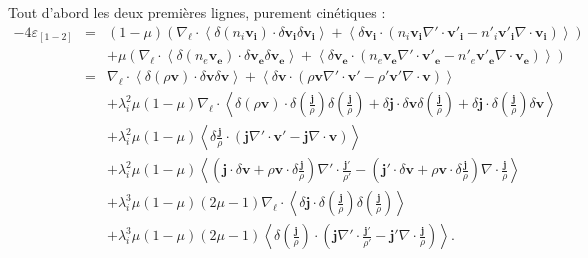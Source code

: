 Tout d'abord les deux premières lignes, purement cinétiques : 
\begin{eqnarray}%
   - 4  \varepsilon_{[1-2]}&=& \left(1-\mu\right)\left( \nabla_{\boldsymbol{\ell}} \cdot\left<  \delta \left(n_i \boldsymbol{v_i}\right) \cdot \delta \boldsymbol{v_i}\delta \boldsymbol{v_i} \right> +\left<\delta \boldsymbol{v_i}\cdot \left(n_i \boldsymbol{v_i}   \nabla' \cdot \boldsymbol{v'_i}- n'_i \boldsymbol{v'_i} \nabla \cdot \boldsymbol{v_i}\right)\right>\right) \nonumber \\ %
 &&+ \mu\left( \nabla_{\boldsymbol{\ell}} \cdot\left<  \delta \left(n_e \boldsymbol{v_e}\right) \cdot \delta \boldsymbol{v_e}\delta \boldsymbol{v_e} \right> +\left<\delta \boldsymbol{v_e}\cdot \left(n_e \boldsymbol{v_e}   \nabla' \cdot \boldsymbol{v'_e}- n'_e \boldsymbol{v'_e} \nabla \cdot \boldsymbol{v_e}\right)\right>\right) \nonumber \\ %
\label{eq:turb_bi_EL1-2} &=& \nabla_{\boldsymbol{\ell}} \cdot\left<  \delta \left(\rho\boldsymbol{v}\right) \cdot \delta \boldsymbol{v} \delta  \boldsymbol{v} \right> +\left< \delta  \boldsymbol{v}\cdot \left(\rho \boldsymbol{v} \nabla' \cdot \boldsymbol{v'} - \rho' \boldsymbol{v'} \nabla \cdot \boldsymbol{v} \right)\right>\nonumber\\%
&&+ \lambda_i^2 \mu\left(1-\mu\right) \nabla_{\boldsymbol{\ell}} \cdot\left< \delta \left(\rho\boldsymbol{v} \right) \cdot \delta \left( \frac{\boldsymbol{j}}{\rho} \right)\delta \left(  \frac{\boldsymbol{j}}{\rho} \right) + \delta \boldsymbol{j} \cdot \delta  \boldsymbol{v}\delta \left(  \frac{\boldsymbol{j}}{\rho} \right) + \delta  \boldsymbol{j}\cdot \delta \left(  \frac{\boldsymbol{j}}{\rho} \right)\delta  \boldsymbol{v}\right> \nonumber\\%
&&+\lambda_i^2 \mu\left(1-\mu\right) \left< \delta  \frac{\boldsymbol{j}}{\rho} \cdot \left( \boldsymbol{j} \nabla' \cdot \boldsymbol{v'}  -  \boldsymbol{j} \nabla \cdot \boldsymbol{v} \right)\right>\nonumber\\%
&&+\lambda_i^2 \mu\left(1-\mu\right) \left< \left( \boldsymbol{j}\cdot\delta  \boldsymbol{v} +\rho \boldsymbol{v}  \cdot\delta  \frac{\boldsymbol{j}}{\rho}  \right)\nabla' \cdot \frac{\boldsymbol{j'}}{\rho'} - \left( \boldsymbol{j'}\cdot\delta  \boldsymbol{v} + \rho \boldsymbol{v} \cdot\delta  \frac{\boldsymbol{j}}{\rho} \right) \nabla \cdot \frac{\boldsymbol{j}}{\rho} \right>\nonumber\\%
&&+ \lambda_i^3\mu\left(1-\mu\right)\left(2\mu - 1\right) \nabla_{\boldsymbol{\ell}} \cdot\left< \delta  \boldsymbol{j} \cdot \delta \left(  \frac{\boldsymbol{j}}{\rho}  \right)\delta \left(  \frac{\boldsymbol{j}}{\rho}  \right) \right> \nonumber \\
&&+ \lambda_i^3\mu\left(1-\mu\right)\left(2\mu - 1\right) \left< \delta \left( \frac{\boldsymbol{j}}{\rho}\right) \cdot \left( \boldsymbol{j} \nabla' \cdot \frac{\boldsymbol{j'}}{\rho'} -  \boldsymbol{j'} \nabla \cdot \frac{\boldsymbol{j}}{\rho} \right)\right>.
\end{eqnarray} %

